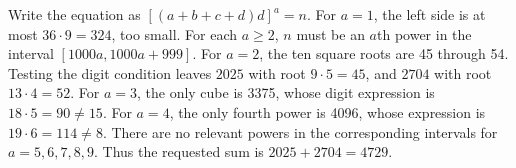 Write the equation as $[(a+b+c+d)d]^a=n$. For $a=1$, the left side is at most $36\cdot9=324$, too small. For each $a\ge2$, $n$ must be an $a$th power in the interval $[1000a,1000a+999]$. For $a=2$, the ten square roots are 45 through 54. Testing the digit condition leaves $2025$ with root $9\cdot5=45$, and $2704$ with root $13\cdot4=52$. For $a=3$, the only cube is 3375, whose digit expression is $18\cdot5=90\ne15$. For $a=4$, the only fourth power is 4096, whose expression is $19\cdot6=114\ne8$. There are no relevant powers in the corresponding intervals for $a=5,6,7,8,9$. Thus the requested sum is $2025+2704=\boxed{4729}$.
